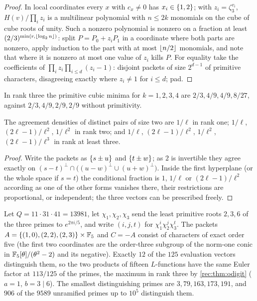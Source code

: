\begin{proof}
In local coordinates every $x$ with $c_x\ne0$ has $x_i\in\{1,2\}$; with $z_i=\zeta_3^{v_i}$, $H(v)/\prod_iz_i$ is a multilinear
polynomial with $n\le2k$ monomials on the cube of cube roots of unity. Such a nonzero polynomial is nonzero
on a fraction at least $(2/3)^{\min(r,\lfloor\log_2n\rfloor)}$: split $P=P_0+z_iP_1$ in a coordinate where both parts are nonzero, apply
induction to the part with at most $\lfloor n/2\rfloor$ monomials, and note that where it is nonzero at most one value of
$z_i$ kills $P$. For equality take the coefficients of $\prod_iz_i\prod_{i\le d}(z_i-1)$: disjoint packets of size $2^{d-1}$ of
primitive characters, disagreeing exactly where $z_i\ne1$ for $i\le d$; pad.
\end{proof}

In rank three the primitive cubic minima for $k=1,2,3,4$ are $2/3,4/9,4/9,8/27$, against $2/3,4/9,2/9,2/9$
without primitivity.

\begin{proposition}\label{rec:prop:otwo}
The agreement densities of distinct pairs of size two are $1/\ell$ in rank one; $1/\ell$, $(2\ell-1)/\ell^2$, $1/\ell^2$ in rank
two; and $1/\ell$, $(2\ell-1)/\ell^2$, $1/\ell^2$, $(2\ell-1)/\ell^3$ in rank at least three.
\end{proposition}

\begin{proof}
Write the packets as $\{s\pm u\}$ and $\{t\pm w\}$; as $2$ is invertible they agree exactly on
$(s-t)^\perp\cap\bigl((u-w)^\perp\cup(u+w)^\perp\bigr)$. Inside the first hyperplane (or the whole space if $s=t$) the conditional
fraction is $1$, $1/\ell$ or $(2\ell-1)/\ell^2$ according as one of the other forms vanishes there, their restrictions are
proportional, or independent; the three vectors can be prescribed freely.
\end{proof}

\begin{example}\label{rec:ex:oquintic}
Let $Q=11\cdot31\cdot41=13981$, let $\chi_1,\chi_2,\chi_3$ send the least primitive roots $2,3,6$ of the three primes to
$e^{2\pi i/5}$, and write $(i,j,t)$ for $\chi_1^i\chi_2^j\chi_3^t$. The packets $A=\{(1,0),(2,2),(2,3)\}\times\mathbb{F}_5$ and $C=-A$ consist of
characters of exact order five (the first two coordinates are the order-three subgroup of the norm-one
conic in $\mathbb{F}_5[\theta]/(\theta^2-2)$ and its negative). Exactly $12$ of the $125$ evaluation vectors distinguish them, so the two
products of fifteen $L$-functions have the same Euler factor at $113/125$ of the primes, the maximum in rank
three by \cref{rec:thm:odigit} ($a=1$, $b=3\mid6$). The smallest distinguishing primes are $3,79,163,173,191$, and $906$ of the
$9589$ unramified primes up to $10^5$ distinguish them.
\end{example}

